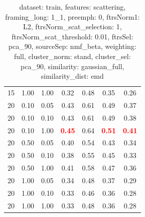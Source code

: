 \begin{table}
\begin{center}
\begin{tabular}{lllcccc}
15 & 1.00 & 1.00 & 0.32 & 0.48 & 0.35 & 0.26 \\ 
20 & 0.10 & 0.05 & 0.43 & 0.61 & 0.49 & 0.37 \\ 
20 & 0.10 & 0.10 & 0.43 & 0.61 & 0.49 & 0.38 \\ 
20 & 0.10 & 1.00 & \textbf{\textcolor{red}{0.45}} & 0.64 & \textbf{\textcolor{red}{0.51}} & \textbf{\textcolor{red}{0.41}} \\ 
20 & 0.50 & 0.05 & 0.40 & 0.54 & 0.43 & 0.34 \\ 
20 & 0.50 & 0.10 & 0.38 & 0.55 & 0.45 & 0.33 \\ 
20 & 0.50 & 1.00 & 0.41 & 0.58 & 0.47 & 0.36 \\ 
20 & 1.00 & 0.05 & 0.34 & 0.48 & 0.37 & 0.29 \\ 
20 & 1.00 & 0.10 & 0.33 & 0.46 & 0.36 & 0.28 \\ 
20 & 1.00 & 1.00 & 0.33 & 0.48 & 0.36 & 0.28 \\ 
\end{tabular} 
\end{center} 
\caption{dataset: train, features: scattering, framing\_long: 1\_1, preemph: 0, ftrsNorm1: L2, ftrsNorm\_scat\_selection: 1, ftrsNorm\_scat\_threshold: 0.01, ftrsSel: pca\_90, sourceSep: nmf\_beta, weighting: full, cluster\_norm: stand, cluster\_sel: pca\_90, similarity: gaussian\_full, similarity\_dist: emd} 
\label{datasetrFeaturscFraminlong1_1Preemp0Ftrsnorm1L2Ftrsnoscatselect1Ftrsnoscatthresh0.01Ftrsselpc90SourcesepnmbeWeightfuClustenormstClusteselpc90SimilagafuSimiladistem} 
\end{table} 
 
  
\clearpage 
  
